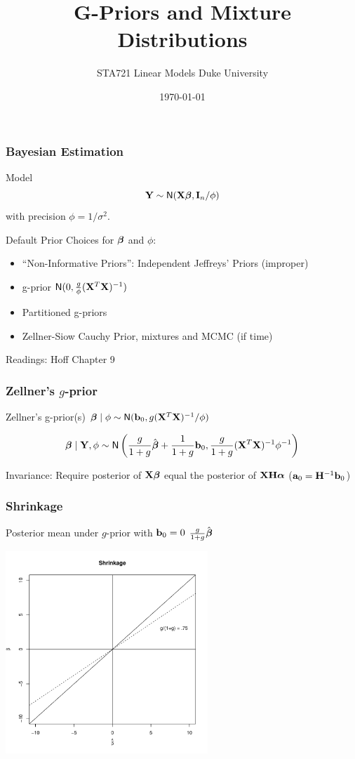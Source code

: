 \documentclass[]{beamer}\usepackage[]{graphicx}\usepackage[]{color}
\title{G-Priors and Mixture Distributions}
\institute{Merlise Clyde}
\author{STA721 Linear Models Duke University}
\date{\today}
\begin{document}
\maketitle

\begin{frame}
  \frametitle{Bayesian Estimation}
  Model
$$
\mathbf{Y} \sim \textsf{N}(\mathbf{X} \boldsymbol{\beta}, \mathbf{I}_n/\phi)
$$
with precision $\phi = 1/\sigma^2$.
\pause

\vfill
Default Prior Choices for $\boldsymbol{\beta}$ and $\phi$:
\begin{itemize}
\item ``Non-Informative Priors'': Independent Jeffreys' Priors (improper)
\item g-prior  $\textsf{N}(0, \frac{g}{\phi}(\mathbf{X}^T\mathbf{X})^{-1})$
\item Partitioned g-priors
\item Zellner-Siow Cauchy Prior, mixtures and MCMC (if time)
\end{itemize}

Readings: Hoff Chapter 9
\end{frame}



\begin{frame}
  \frametitle{Zellner's $g$-prior}
Zellner's g-prior(s) $\boldsymbol{\beta} \mid \phi \sim \textsf{N}(\mathbf{b}_0, g
    (\mathbf{X}^T\mathbf{X})^{-1}/\phi)$ \pause

$$\boldsymbol{\beta} \mid \mathbf{Y}, \phi \sim \textsf{N}\left( \frac{g}{1 + g} \hat{\boldsymbol{\beta}} +  \frac{1}{1 + g}
\mathbf{b}_0, \frac{g}{1 + g} (\mathbf{X}^T\mathbf{X})^{-1} \phi^{-1} \right)$$ \pause



\vspace{1in}
 Invariance: Require posterior of   $\mathbf{X} \boldsymbol{\beta}$  equal the posterior of $\mathbf{X} \mathbf{H} \boldsymbol{\alpha}$
\pause   ($\mathbf{a}_0 = \mathbf{H}^{-1} \mathbf{b}_0$)



\end{frame}

\begin{frame}
  \frametitle{Shrinkage}
 Posterior mean under  $g$-prior  with $\mathbf{b}_0 = 0$
$\frac{g}{1 +g} \hat{\boldsymbol{\beta}} $

\centerline{\includegraphics[height=3in]{shrinkage}}
\end{frame}
\end{document}
